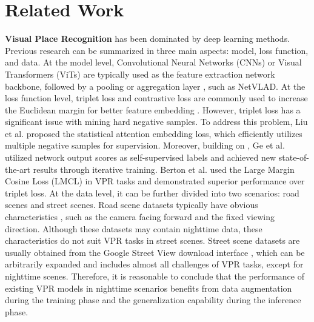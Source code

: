 \documentclass[10pt,twocolumn,letterpaper]{article}
\begin{document}
\section{Related Work}
\label{sec:related_work}

\noindent \textbf{Visual Place Recognition} has been dominated by deep learning methods. Previous research can be summarized in three main aspects: model, loss function, and data. At the model level, Convolutional Neural Networks (CNNs) \cite{netvlad} or Visual Transformers (ViTs) \cite{transvpr} are typically used as the feature extraction network backbone, followed by a pooling or aggregation layer \cite{netvlad, dir}, such as NetVLAD. At the loss function level, triplet loss and contrastive loss are commonly used to increase the Euclidean margin for better feature embedding \cite{dvg}. However, triplet loss has a significant issue with mining hard negative samples. To address this problem, Liu et al. \cite{sare} proposed the statistical attention embedding loss, which efficiently utilizes multiple negative samples for supervision. Moreover, building on \cite{sfrs}, Ge et al. \cite{sfrs} utilized network output scores as self-supervised labels and achieved new state-of-the-art results through iterative training. Berton et al. \cite{cosplace} used the Large Margin Cosine Loss (LMCL) in VPR tasks and demonstrated superior performance over triplet loss. At the data level, it can be further divided into two scenarios: road scenes and street scenes. Road scene datasets typically have obvious characteristics \cite{kitti, robotcar, msls}, such as the camera facing forward and the fixed viewing direction. Although these datasets may contain nighttime data, these characteristics do not suit VPR tasks in street scenes. Street scene datasets are usually obtained from the Google Street View download interface \cite{ gsv_cities, gsv, cosplace}, which can be arbitrarily expanded and includes almost all challenges of VPR tasks, except for nighttime scenes. Therefore, it is reasonable to conclude that the performance of existing VPR models in nighttime scenarios benefits from data augmentation during the training phase and the generalization capability during the inference phase.
\end{document}
